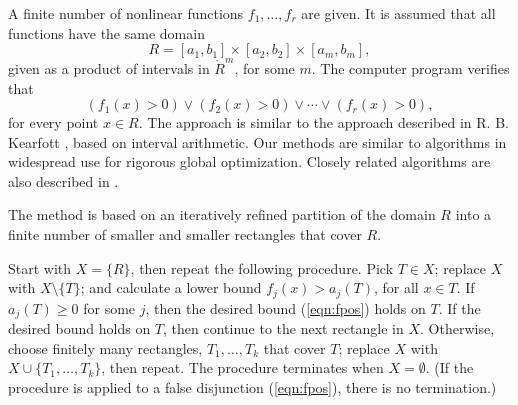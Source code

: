 \documentclass{article} %
\begin{document}
A finite number of nonlinear functions $f_1,\ldots,f_r$ are given. It
is assumed that all functions have the same domain
$$R= [a_1,b_1] \times [a_2,b_2] \times [a_m,b_m],$$
given as a product of intervals in $\ring{R}^m$, for some $m$. The
computer program verifies that
\begin{equation}\label{eqn:fpos}
  (f_1(x) >0) \lor (f_2(x) >0) \lor \cdots \lor (f_r(x) >0),
\end{equation}
for every point $x\in R$. The approach is similar to the approach
described in R. B. Kearfott \cite{Kearfott:1996:Interval}, based on interval
arithmetic. Our methods are similar to algorithms in widespread use
for rigorous global optimization. Closely related algorithms are also
described in \cite{Zumkeller:2006:IJCAR}.

The method is based on an iteratively refined 
partition of the domain  $R$
into a finite number of smaller and smaller rectangles that cover $R$.

Start with $X=\{R\}$,  then repeat the following procedure.
Pick $T\in X$; replace $X$ with $X\setminus\{T\}$; and
calculate a lower bound $f_j(x) > a_j(T)$, 
for all $x\in T$.  If $a_j(T)\ge 0$ for some $j$, then
the desired bound (\ref{eqn:fpos}) holds on $T$.  
If the desired bound holds on $T$, then continue to the next
rectangle in $X$.
Otherwise, choose finitely many rectangles, $T_1,\ldots,T_k$ that cover $T$;
replace $X$ with $X\cup\{T_1,\ldots,T_k\}$, then repeat.
The procedure terminates when $X=\emptyset$.  (If the procedure
is applied to a false disjunction (\ref{eqn:fpos}), there is no
termination.)


\end{document}
